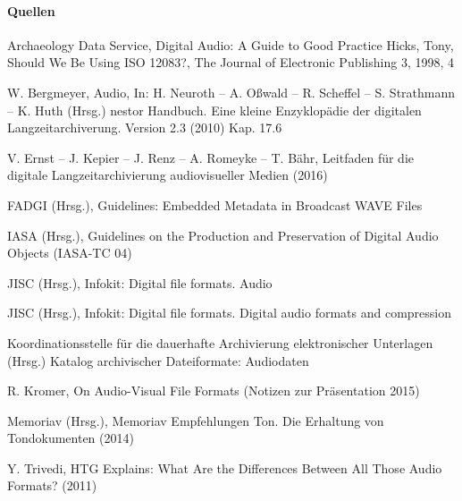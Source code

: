 \paragraph{Quellen}
\begin{flushleft}
Archaeology Data Service, Digital Audio: A Guide to Good Practice 
Hicks, Tony, Should We Be Using ISO 12083?, The Journal of Electronic Publishing 3, 1998, 4 

W. Bergmeyer, Audio, In: H. Neuroth -- A. Oßwald -- R. Scheffel -- S. Strathmann -- K. Huth (Hrsg.) nestor Handbuch. Eine kleine Enzyklopädie der digitalen Langzeitarchiverung. Version 2.3 (2010) Kap. 17.6 

V. Ernst -- J. Kepier -- J. Renz -- A. Romeyke -- T. Bähr, Leitfaden für die digitale Langzeitarchivierung audiovisueller Medien (2016) 

FADGI (Hrsg.), Guidelines: Embedded Metadata in Broadcast WAVE Files 

IASA (Hrsg.), Guidelines on the Production and Preservation of Digital Audio Objects (IASA-TC 04) 

JISC (Hrsg.), Infokit: Digital file formats. Audio 

JISC (Hrsg.), Infokit: Digital file formats. Digital audio formats and compression 

Koordinationsstelle für die dauerhafte Archivierung elektronischer Unterlagen (Hrsg.) Katalog archivischer Dateiformate: Audiodaten 

R. Kromer, On Audio-Visual File Formats (Notizen zur Präsentation 2015) 

Memoriav (Hrsg.), Memoriav Empfehlungen Ton. Die Erhaltung von Tondokumenten (2014) 

Y. Trivedi, HTG Explains: What Are the Differences Between All Those Audio Formats? (2011) 


\end{flushleft}
